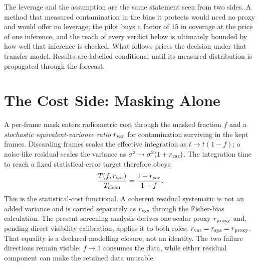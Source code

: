 The leverage and the assumption are the same statement seen from two sides. A method that measured contamination in the bins it protects would need no proxy and would offer no leverage; the pilot buys a factor of $15$ in coverage at the price of one inference, and the reach of every verdict below is ultimately bounded by how well that inference is checked. What follows prices the decision under that transfer model.  Results are labelled conditional until its measured distribution is propagated through the forecast.

\section{The Cost Side: Masking Alone}
\label{sec:tolerance:cost}

A per-frame mask enters radiometric cost through the masked fraction $f$ and a \emph{stochastic equivalent-variance ratio} $r_{\rm var}$ for contamination surviving in the kept frames.  Discarding frames scales the effective integration as $t \to t(1-f)$; a noise-like residual scales the variance as $\sigma^2 \to \sigma^2(1+r_{\rm var})$.  The integration time to reach a fixed statistical-error target therefore obeys
\begin{equation}
\label{eq:tolerance:teff}
\frac{T(f, r_{\rm var})}{T_{\text{clean}}} = \frac{1 + r_{\rm var}}{1 - f}.
\end{equation}
This is the statistical-cost functional.  A coherent residual systematic is not an added variance and is carried separately as $r_{\rm sys}$ through the Fisher-bias calculation.  The present screening analysis derives one scalar proxy $r_{\rm proxy}$ and, pending direct visibility calibration, applies it to both roles: $r_{\rm var}=r_{\rm sys}=r_{\rm proxy}$.  That equality is a declared modelling closure, not an identity.  The two failure directions remain visible: $f\to1$ consumes the data, while either residual component can make the retained data unusable.


